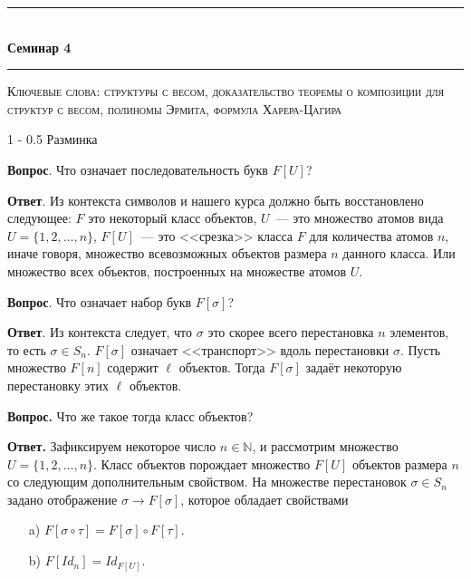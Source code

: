 \documentclass[a5paper]{article}
\makeatletter
\def \topic {Семинар 4}
\theoremstyle{definition}
\renewcommand{\section}{\@startsection
{section}%
{1}%
{\z@}%
{-\baselineskip}%
{0.5\baselineskip}%
{\centering\large\scshape}} %
\makeatother
\begin{document}
\begin{center}

\newcommand{\HRule}{\rule{\linewidth}{0.5mm}}
\HRule \\[0.2cm]
{ \Large \bfseries \topic} %
\HRule

\end{center}

\textsc{Ключевые слова: 
структуры с весом, доказательство теоремы о композиции для структур с весом,
полиномы Эрмита, формула Харера-Цагира
}

\section{Разминка}

\textbf{Вопрос}. Что означает последовательность букв \( F[U] \)?

\textbf{Ответ}. Из контекста символов и нашего курса должно быть
восстановлено следующее: \( F \) это некоторый класс объектов, \( U \)~--- это
множество атомов вида \( U = \{ 1, 2, \ldots, n \} \), \( F[U] \)~--- это
<<срезка>> класса \( F \) для количества атомов \( n \), иначе говоря, множество
всевозможных объектов размера \( n \) данного класса. Или множество всех
объектов, построенных на множестве атомов \( U \).

\textbf{Вопрос}. Что означает набор букв \( F[\sigma] \)?

\textbf{Ответ}. Из контекста следует, что \( \sigma \) это скорее всего
перестановка \( n \) элементов, то есть \( \sigma \in S_n \). \( F[\sigma]\)
означает <<транспорт>> вдоль перестановки \( \sigma \). Пусть множество \( F[n]
\) содержит \( \ell \) объектов. Тогда \( F[\sigma] \) задаёт некоторую
перестановку этих \( \ell \) объектов.

\textbf{Вопрос.} Что же такое тогда класс объектов?

\textbf{Ответ.} Зафиксируем некоторое число \( n \in \mathbb N \), и рассмотрим
множество \( U = \{ 1, 2, \ldots, n \} \). Класс объектов порождает множество \(
F[U] \) объектов размера \( n \) со следующим дополнительным свойством. На
множестве перестановок \( \sigma \in
S_n \) задано отображение \( \sigma \to F[\sigma] \), которое обладает
свойствами
\begin{enumerate}
 \item[a)] \( F[\sigma \circ \tau] = F[\sigma]\circ F[\tau] \).
 \item[b)] \( F[Id_n] = Id_{F[U]} \). 
\end{enumerate}
\end{document}
